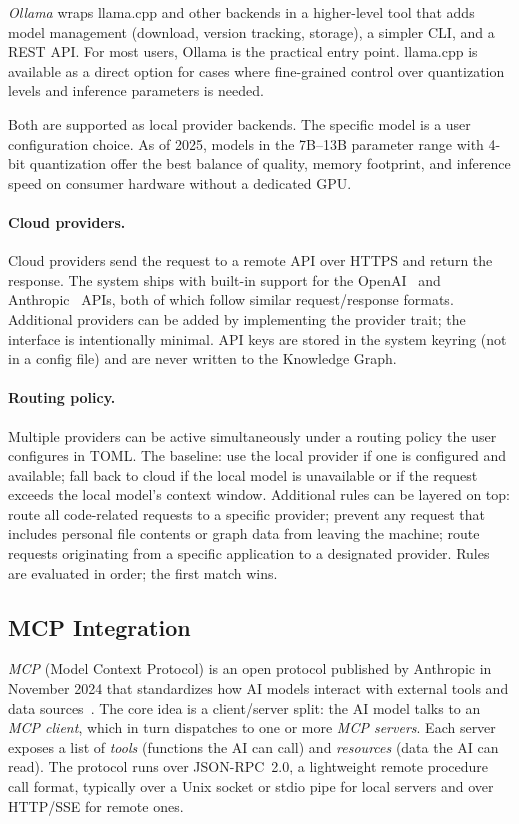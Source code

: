 \emph{Ollama} wraps llama.cpp and other backends in a higher-level tool that
adds model management (download, version tracking, storage), a simpler CLI,
and a REST API. For most users, Ollama is the practical entry point. llama.cpp
is available as a direct option for cases where fine-grained control over
quantization levels and inference parameters is needed.

Both are supported as local provider backends. The specific model is a user
configuration choice. As of 2025, models in the 7B--13B parameter range with
4-bit quantization offer the best balance of quality, memory footprint, and
inference speed on consumer hardware without a dedicated GPU.

\paragraph{Cloud providers.}
Cloud providers send the request to a remote API over HTTPS and return the
response. The system ships with built-in support for the
OpenAI~\cite{openai:api} and Anthropic~\cite{anthropic:api} APIs, both of
which follow similar request/response formats. Additional providers can be
added by implementing the provider trait; the interface is intentionally
minimal. API keys are stored in the system keyring (not in a config file) and
are never written to the Knowledge Graph.

\paragraph{Routing policy.}
Multiple providers can be active simultaneously under a routing policy the
user configures in TOML. The baseline: use the local provider if one is
configured and available; fall back to cloud if the local model is unavailable
or if the request exceeds the local model's context window. Additional rules
can be layered on top: route all code-related requests to a specific provider;
prevent any request that includes personal file contents or graph data from
leaving the machine; route requests originating from a specific application to
a designated provider. Rules are evaluated in order; the first match wins.

\subsection{MCP Integration}
\label{sec:mcp}

\emph{MCP} (Model Context Protocol) is an open protocol published by Anthropic
in November 2024 that standardizes how AI models interact with external tools
and data sources~\cite{mcp:spec}. The core idea is a client/server split: the
AI model talks to an \emph{MCP client}, which in turn dispatches to one or more
\emph{MCP servers}. Each server exposes a list of \emph{tools} (functions the
AI can call) and \emph{resources} (data the AI can read). The protocol runs
over JSON-RPC~2.0, a lightweight remote procedure call format, typically over
a Unix socket or stdio pipe for local servers and over HTTP/SSE for remote
ones.

